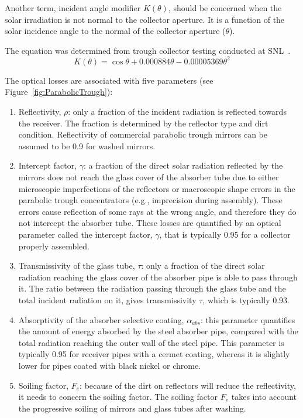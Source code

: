 Another term, incident angle modifier $K(\theta)$, should be concerned when the solar irradiation is not normal to the collector aperture. It is a function of the solar incidence angle to the normal of the collector aperture ($\theta$).

The equation was determined from trough collector testing conducted at SNL~\cite{Dudley1994}.
\begin{equation}
  K(\theta) = \cos\theta+0.000884\theta-0.00005369\theta^2
\end{equation}

The optical losses are associated with five parameters (see Figure~\ref{fig:ParabolicTrough}):

\begin{enumerate}[label=(\arabic*)]
  \item Reflectivity, $\rho$: only a fraction of the incident radiation is reflected towards the receiver. The fraction is determined by the reflector type and dirt condition. Reflectivity of commercial parabolic trough mirrors can be assumed to be 0.9 for washed mirrors. 
  \item Intercept factor, $\gamma$: a fraction of the direct solar radiation reflected by the mirrors does not reach the glass cover of the absorber tube due to either microscopic imperfections of the reflectors or macroscopic shape errors in the parabolic trough concentrators (e.g., imprecision during assembly). These errors cause reflection of some rays at the wrong angle, and therefore they do not intercept the absorber tube. These losses are quantified by an optical parameter called the intercept factor, $\gamma$, that is typically 0.95 for a collector properly assembled.
  \item Transmissivity of the glass tube, $\tau$: only a fraction of the direct solar radiation reaching the glass cover of the absorber pipe is able to pass through it. The ratio between the radiation passing through the glass tube and the total incident radiation on it, gives transmissivity $\tau$,  which is typically 0.93.
  \item Absorptivity of the absorber selective coating, $\alpha_{abs}$: this parameter quantifies the amount of energy absorbed by the steel absorber pipe, compared with the total radiation reaching the outer wall of the steel pipe. This parameter is typically 0.95 for receiver pipes with a cermet coating, whereas it is slightly lower for pipes coated with black nickel or chrome.
  \item Soiling factor, $F_e$: because of the dirt on reflectors will reduce the reflectivity, it needs to concern the soiling factor. The soiling factor $F_e$ takes into account the progressive soiling of mirrors and glass tubes after washing.
\end{enumerate}

